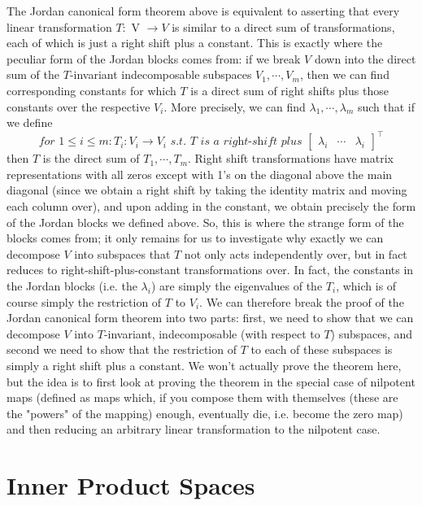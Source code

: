 \documentclass{article}
\newcommand{\sti}{\textit{ s.t. }}
\begin{document}
The Jordan canonical form theorem above is equivalent to asserting that every linear transformation $ T: $ V $ \rightarrow V $ is similar to a direct sum of transformations, each of which is just a right shift plus a constant. This is exactly where the peculiar form of the Jordan blocks comes from: if we break $ V $ down into the direct sum of the $ T $-invariant indecomposable subspaces $ V_1, \cdots, V_m $, then we can find corresponding constants for which $ T $ is a direct sum of right shifts plus those constants over the respective $ V_i $. More precisely, we can find $ \lambda_1, \cdots, \lambda_m $ such that if we define
	$$ \textit{for } 1 \leq i \leq m: T_i: V_i \rightarrow V_i \sti T \textit{ is a right-shift plus } \begin{bmatrix} \lambda_i & \cdots & \lambda_i \end{bmatrix}^\intercal $$
then $ T $ is the direct sum of $ T_1, \cdots, T_m $. Right shift transformations have matrix representations with all zeros except with 1's on the diagonal above the main diagonal (since we obtain a right shift by taking the identity matrix and moving each column over), and upon adding in the constant, we obtain precisely the form of the Jordan blocks we defined above. So, this is where the strange form of the blocks comes from; it only remains for us to investigate why exactly we can decompose $ V $ into subspaces that $ T $ not only acts independently over, but in fact reduces to right-shift-plus-constant transformations over. In fact, the constants in the Jordan blocks (i.e. the $ \lambda_i $) are simply the eigenvalues of the $ T_i $, which is of course simply the restriction of $ T $ to $ V_i $. We can therefore break the proof of the Jordan canonical form theorem into two parts: first, we need to show that we can decompose $ V $ into $ T $-invariant, indecomposable (with respect to $ T $) subspaces, and second we need to show that the restriction of $ T $ to each of these subspaces is simply a right shift plus a constant. We won't actually prove the theorem here, but the idea is to first look at proving the theorem in the special case of nilpotent maps (defined as maps which, if you compose them with themselves (these are the "powers" of the mapping) enough, eventually die, i.e. become the zero map) and then reducing an arbitrary linear transformation to the nilpotent case.

\section{Inner Product Spaces}
\end{document}
